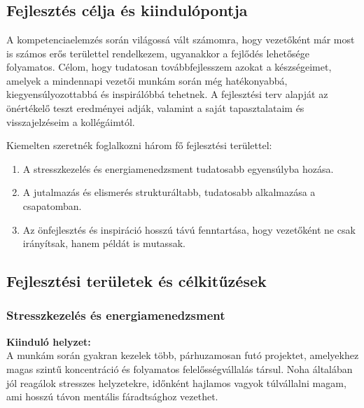 \chapter{\DevelopementPlan}
\section{Fejlesztés célja és kiindulópontja}

A kompetenciaelemzés során világossá vált számomra, hogy vezetőként már most is számos erős területtel rendelkezem, ugyanakkor a fejlődés lehetősége folyamatos.
Célom, hogy tudatosan továbbfejlesszem azokat a készségeimet, amelyek a mindennapi vezetői munkám során még hatékonyabbá, kiegyensúlyozottabbá és inspirálóbbá tehetnek.
A fejlesztési terv alapját az önértékelő teszt eredményei adják, valamint a saját tapasztalataim és visszajelzéseim a kollégáimtól.

Kiemelten szeretnék foglalkozni három fő fejlesztési területtel:

\begin{enumerate}
    \item A stresszkezelés és energiamenedzsment tudatosabb egyensúlyba hozása.
    \item A jutalmazás és elismerés strukturáltabb, tudatosabb alkalmazása a csapatomban.
    \item Az önfejlesztés és inspiráció hosszú távú fenntartása, hogy vezetőként ne csak irányítsak, hanem példát is mutassak.
\end{enumerate}

\section{Fejlesztési területek és célkitűzések}

\subsection{Stresszkezelés és energiamenedzsment}

\textbf{Kiinduló helyzet:} \\
A munkám során gyakran kezelek több, párhuzamosan futó projektet, amelyekhez magas szintű koncentráció és folyamatos felelősségvállalás társul.
Noha általában jól reagálok stresszes helyzetekre, időnként hajlamos vagyok túlvállalni magam, ami hosszú távon mentális fáradtsághoz vezethet.

